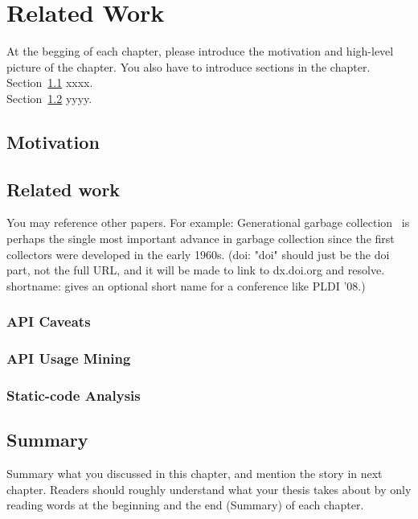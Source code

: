 \chapter{Related Work}
\label{cha:background}
At the begging of each chapter, please introduce the motivation and high-level
picture of the chapter. You also have to introduce sections in the
chapter. \\


Section~\ref{sec:motivation} xxxx.\\


Section~\ref{sec:relatedwork} yyyy.\\


\section{Motivation}
\label{sec:motivation}


\section{Related work}
\label{sec:relatedwork}
You may reference other papers. For example: 
Generational garbage collection~\citep{LH:83,Moon:84,Ungar:84} is perhaps the
single most important advance in garbage collection since the first collectors
were developed in the early 1960s. (doi: "doi" should just be the doi part, not
the full URL, and it will be made to link to dx.doi.org and resolve.
shortname: gives an optional short name for a conference like PLDI '08.)

\subsection{API Caveats}

\subsection{API Usage Mining}

\subsection{Static-code Analysis}


\section{Summary}
Summary what you discussed in this chapter, and mention the story in next
chapter. Readers should roughly understand what your thesis takes about by only reading
words at the beginning and the end (Summary) of each chapter.



